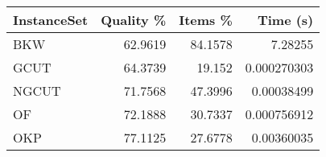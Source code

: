 \begin{tabular}{lrrr}
    \hline
    InstanceSet & Quality \% & Items \% & Time (s)    \\
    \hline
    BKW         & 62.9619    & 84.1578  & 7.28255     \\
    GCUT        & 64.3739    & 19.152   & 0.000270303 \\
    NGCUT       & 71.7568    & 47.3996  & 0.00038499  \\
    OF          & 72.1888    & 30.7337  & 0.000756912 \\
    OKP         & 77.1125    & 27.6778  & 0.00360035  \\
    \hline
\end{tabular}